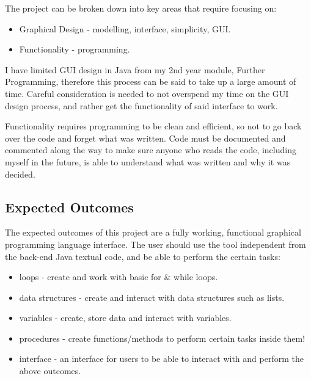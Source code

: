 \documentclass[a4paper, 12pt]{article}
\begin{document}
            The project can be broken down into key areas that require focusing on:
        
            \begin{itemize}
                \item Graphical Design - modelling, interface, simplicity, GUI.
                \item Functionality - programming.
            \end{itemize}

            I have limited GUI design in Java from my 2nd year module, Further Programming, therefore this 
            process can be said to take up a large amount of time. Careful consideration is needed to 
            not overspend my time on the GUI design process, and rather get the functionality of said 
            interface to work.

            Functionality requires programming to be clean and efficient, so not to go back over the code 
            and forget what was written. Code must be documented and commented along the way to make sure 
            anyone who reads the code, including myself in the future, is able to understand what was 
            written and why it was decided.

            \subsection{Expected Outcomes}
            The expected outcomes of this project are a fully working, functional graphical programming 
            language interface. The user should use the tool independent from the back-end Java textual 
            code, and be able to perform the certain tasks:

            \begin{itemize}
                \item loops - create and work with basic for \& while loops.
                \item data structures - create and interact with data structures such as lists.
                \item variables - create, store data and interact with variables.
                \item procedures - create functions/methods to perform certain tasks inside them!
                \item interface - an interface for users to be able to interact with and perform the
                above outcomes.
            \end{itemize}
\end{document}
